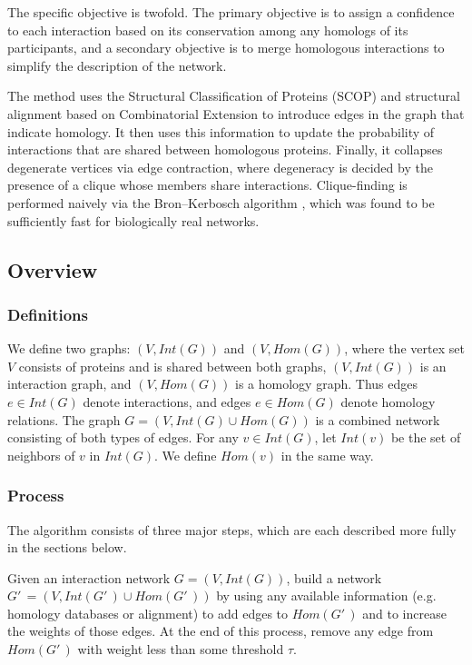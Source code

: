\documentclass[12pt,twoside]{article}
\begin{document}
The specific objective is twofold. The primary objective is to assign a confidence to each interaction based on its conservation among any homologs of its participants, and a secondary objective is to merge homologous interactions to simplify the description of the network.

The method uses the Structural Classification of Proteins (SCOP) \cite{scop} and structural alignment based on Combinatorial Extension \cite{ce} to introduce edges in the graph that indicate homology. It then uses this information to update the probability of interactions that are shared between homologous proteins. Finally, it collapses degenerate vertices via edge contraction, where degeneracy is decided by the presence of a clique whose members share interactions. Clique-finding is performed naively via the Bron--Kerbosch algorithm \cite{bron}, which was found to be sufficiently fast for biologically real networks.

\subsection{Overview}

\subsubsection{Definitions}
We define two graphs: $(V, Int(G))$ and $(V, Hom(G))$, where the vertex set $V$ consists of proteins and is shared between both graphs, $(V, Int(G))$ is an interaction graph, and $(V, Hom(G))$ is a homology graph. Thus edges $e \in Int(G)$ denote interactions, and edges $e \in Hom(G)$ denote homology relations. The graph $G = (V,Int(G) \cup Hom(G))$ is a combined network consisting of both types of edges. For any $v \in Int(G)$, let $Int(v)$ be the set of neighbors of $v$ in $Int(G)$. We define $Hom(v)$ in the same way.

\subsubsection{Process}
The algorithm consists of three major steps, which are each described more fully in the sections below.

Given an interaction network $G=(V,Int(G))$, build a network $G'\,\! = (V,Int(G'\,\!) \cup Hom(G'\,\!))$ by using any available information (e.g. homology databases or alignment) to add edges to $Hom(G'\,\!)$ and to increase the weights of those edges. At the end of this process, remove any edge from $Hom(G'\,\!)$ with  weight less than some threshold $\tau$.
\end{document}
